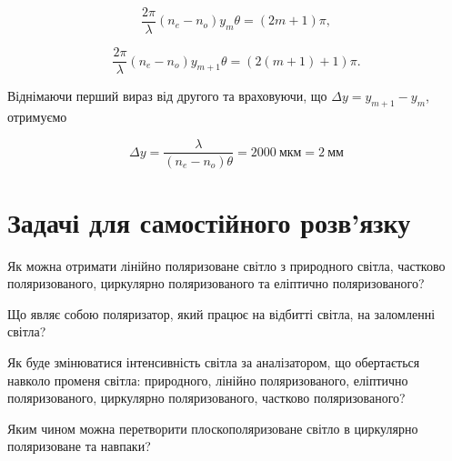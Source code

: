 \begin{solutionexample}
\begin{equation*}
    \frac{2\pi}{\lambda}(n_e - n_o) y_m\theta = (2m + 1)\pi,
\end{equation*}

\begin{equation*}
    \frac{2\pi}{\lambda}(n_e - n_o) y_{m + 1}\theta = (2(m + 1) + 1)\pi.
\end{equation*}

Віднімаючи перший вираз від другого та враховуючи, що $ \Delta y = y_{m + 1} - y_m $, отримуємо

\begin{equation*}
    \Delta y = \frac{\lambda}{(n_e - n_o)\theta} = 2000\ \text{мкм} = 2\  \text{мм}
\end{equation*}

\end{solutionexample}

\section{Задачі для самостійного розв’язку }

\begin{problem}%
    Як можна отримати лінійно поляризоване світло з природного світла, частково поляризованого, циркулярно поляризованого та еліптично поляризованого?
\end{problem}

\begin{problem}%
    Що являє собою поляризатор, який працює на відбитті світла, на заломленні світла?
\end{problem}

\begin{problem}%
    Як буде змінюватися інтенсивність світла за аналізатором, що обертається навколо променя світла: природного, лінійно поляризованого, еліптично поляризованого, циркулярно поляризованого, частково поляризованого?
\end{problem}

\begin{problem}%
    Яким чином можна перетворити плоскополяризоване світло в циркулярно поляризоване та навпаки?
\end{problem}


